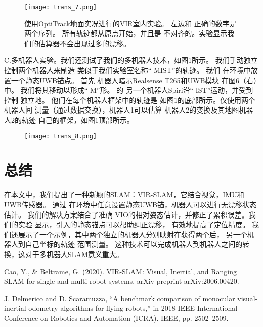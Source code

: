 \begin{translation}
\begin{figure}
  \centering
  \texttt{[image: trans\_7.png]}
  \caption{使用OptiTrack地面实况进行的VIR室内实验。 左边和
正确的数字是两个序列。 所有轨迹都从原点开始，并且是
不对齐的。实验显示我们的估算器不会出现过多的漂移。}
  \label{fig:gmapping}
\end{figure}



C.多机器人实验。我们还测试了我们的多机器人技术，如图1所示。 我们手动独立控制两个机器人来制造
类似于我们实验室名称“ MIST”的轨迹。 我们 在环境中放置一个静态UWB锚点。 首先 机器人暗示Realsense T265和UWB模块
在图6（右）中。 我们将其移动以形成“ M”形。 的 另一个机器人Spiri沿“ IST”运动，并受到控制 独立地。 他们在每个机器人框架中的轨迹是
如图1的底部所示。仅使用两个机器人间 测量（通过数据交换），机器人1可以估算 机器人2的变换及其地图机器人2的轨迹
自己的框架，如图1顶部所示。


\begin{figure}
  \centering
  \texttt{[image: trans\_8.png]}
  \caption{}
  \label{fig:gmapping}
\end{figure}


\section{总结}

在本文中，我们提出了一种新颖的SLAM：VIR-SLAM，它结合视觉，IMU和UWB传感器。 通过
在环境中任意设置静态UWB锚，机器人可以进行无漂移状态估计。 我们的解决方案结合了准确
VIO的相对姿态估计，并修正了累积误差。我们的实验 显示，引入的静态锚点可以帮助纠正漂移，
有效地提高了定位精度。 我们还展示了一个示例，其中两个独立的机器人分别映射在获得两个后，
另一个机器人到自己坐标的轨迹
范围测量。 这种技术可以完成机器人到机器人之间的转换，这对于多机器人SLAM意义重大。


\nocite{abrahams99tex,salomon1995advanced}



\begin{thebibliography}{2}    

Cao, Y., & Beltrame, G. (2020). VIR-SLAM: Visual, Inertial, and Ranging SLAM for single and multi-robot systems. arXiv preprint arXiv:2006.00420.

  J. Delmerico and D. Scaramuzza, “A benchmark comparison of
monocular visual-inertial odometry algorithms for flying robots,” in
2018 IEEE International Conference on Robotics and Automation
(ICRA). IEEE, pp. 2502–2509.


\end{thebibliography}
\end{translation}
